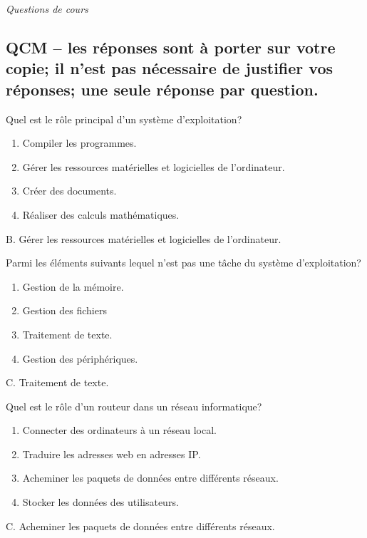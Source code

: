 \documentclass[11pt,a4paper]{exam}
\newenvironment{QCM}
{\begin{enumerate}[label=\Alph*.]}
	{\end{enumerate}}
\begin{document}
    \begin{questions} %
		\begin{spacing}{1}
    
		\question \textit{Questions de cours}
		\begin{parts}
			\part[3]{QCM -- les réponses sont à porter sur votre copie; il n'est pas nécessaire de justifier vos réponses; une seule réponse par question.}
			\begin{subparts}
			
				\subpart Quel est le rôle principal d'un système d'exploitation?
				\begin{QCM}
					\item Compiler les programmes.
					\item Gérer les ressources matérielles et logicielles de l'ordinateur.
					\item Créer des documents.
					\item Réaliser des calculs mathématiques.
				\end{QCM}
				\begin{solution}
					B. Gérer les ressources matérielles et logicielles de l'ordinateur.
				\end{solution}

				\subpart Parmi les éléments suivants lequel n'est pas une tâche du système d'exploitation?
				\begin{QCM}
					\item Gestion de la mémoire.
					\item Gestion des fichiers
					\item Traitement de texte.
					\item Gestion des périphériques.
				\end{QCM}
				\begin{solution}
					C. Traitement de texte.
				\end{solution}
				
				\subpart Quel est le rôle d'un routeur dans un réseau informatique?
				\begin{QCM}
					\item Connecter des ordinateurs à un réseau local.
					\item Traduire les adresses web en adresses IP.
					\item Acheminer les paquets de données entre différents réseaux.
					\item  Stocker les données des utilisateurs.
				\end{QCM}
				\begin{solution}
					C. Acheminer les paquets de données entre différents réseaux.
				\end{solution}
				

\end{subparts}
\end{parts}
\end{spacing}
\end{questions}
\end{document}
